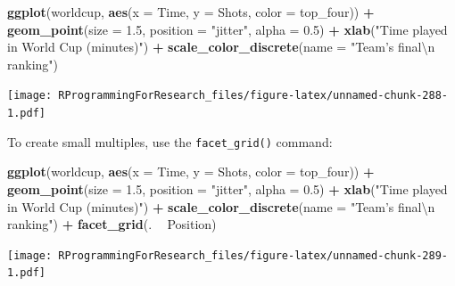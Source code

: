 \documentclass[]{book}
\makeatletter
\newenvironment{Shaded}{\begin{snugshade}}{\end{snugshade}}
\newcommand{\KeywordTok}[1]{\textcolor[rgb]{0.13,0.29,0.53}{\textbf{#1}}}
\newcommand{\DataTypeTok}[1]{\textcolor[rgb]{0.13,0.29,0.53}{#1}}
\newcommand{\FloatTok}[1]{\textcolor[rgb]{0.00,0.00,0.81}{#1}}
\newcommand{\CharTok}[1]{\textcolor[rgb]{0.31,0.60,0.02}{#1}}
\newcommand{\StringTok}[1]{\textcolor[rgb]{0.31,0.60,0.02}{#1}}
\newcommand{\OperatorTok}[1]{\textcolor[rgb]{0.81,0.36,0.00}{\textbf{#1}}}
\newcommand{\NormalTok}[1]{#1}
\newenvironment{kframe}{%
\medskip{}
\setlength{\fboxsep}{.8em}
 \def\at@end@of@kframe{}%
 \ifinner\ifhmode%
  \def\at@end@of@kframe{\end{minipage}}%
  \begin{minipage}{\columnwidth}%
 \fi\fi%
 \def\FrameCommand##1{\hskip\@totalleftmargin \hskip-\fboxsep
 \colorbox{shadecolor}{##1}\hskip-\fboxsep
     \hskip-\linewidth \hskip-\@totalleftmargin \hskip\columnwidth}%
 \MakeFramed {\advance\hsize-\width
   \@totalleftmargin\z@ \linewidth\hsize
   \@setminipage}}%
 {\par\unskip\endMakeFramed%
 \at@end@of@kframe}
\renewenvironment{Shaded}{\begin{kframe}}{\end{kframe}}
\theoremstyle{definition}
\theoremstyle{definition}
\theoremstyle{definition}
\theoremstyle{remark}
\makeatother
\begin{document}
\begin{Shaded}
\begin{Highlighting}[]
\KeywordTok{ggplot}\NormalTok{(worldcup, }\KeywordTok{aes}\NormalTok{(}\DataTypeTok{x =}\NormalTok{ Time, }\DataTypeTok{y =}\NormalTok{ Shots,}
                     \DataTypeTok{color =}\NormalTok{ top_four)) }\OperatorTok{+}
\StringTok{        }\KeywordTok{geom_point}\NormalTok{(}\DataTypeTok{size =} \FloatTok{1.5}\NormalTok{, }\DataTypeTok{position =} \StringTok{"jitter"}\NormalTok{,}
                   \DataTypeTok{alpha =} \FloatTok{0.5}\NormalTok{)  }\OperatorTok{+}\StringTok{ }
\StringTok{        }\KeywordTok{xlab}\NormalTok{(}\StringTok{"Time played in World Cup (minutes)"}\NormalTok{) }\OperatorTok{+}\StringTok{ }
\StringTok{        }\KeywordTok{scale_color_discrete}\NormalTok{(}\DataTypeTok{name =} \StringTok{"Team's final}\CharTok{\textbackslash{}n}\StringTok{ ranking"}\NormalTok{)}
\end{Highlighting}
\end{Shaded}

\texttt{[image: RProgrammingForResearch\_files/figure-latex/unnamed-chunk-288-1.pdf]}

To create small multiples, use the \texttt{facet\_grid()} command:

\begin{Shaded}
\begin{Highlighting}[]
\KeywordTok{ggplot}\NormalTok{(worldcup, }\KeywordTok{aes}\NormalTok{(}\DataTypeTok{x =}\NormalTok{ Time, }\DataTypeTok{y =}\NormalTok{ Shots,}
                     \DataTypeTok{color =}\NormalTok{ top_four)) }\OperatorTok{+}
\StringTok{        }\KeywordTok{geom_point}\NormalTok{(}\DataTypeTok{size =} \FloatTok{1.5}\NormalTok{, }\DataTypeTok{position =} \StringTok{"jitter"}\NormalTok{,}
                   \DataTypeTok{alpha =} \FloatTok{0.5}\NormalTok{)  }\OperatorTok{+}\StringTok{ }
\StringTok{        }\KeywordTok{xlab}\NormalTok{(}\StringTok{"Time played in World Cup (minutes)"}\NormalTok{) }\OperatorTok{+}\StringTok{ }
\StringTok{        }\KeywordTok{scale_color_discrete}\NormalTok{(}\DataTypeTok{name =} \StringTok{"Team's final}\CharTok{\textbackslash{}n}\StringTok{ ranking"}\NormalTok{) }\OperatorTok{+}\StringTok{ }
\StringTok{        }\KeywordTok{facet_grid}\NormalTok{(. }\OperatorTok{~}\StringTok{ }\NormalTok{Position)}
\end{Highlighting}
\end{Shaded}

\texttt{[image: RProgrammingForResearch\_files/figure-latex/unnamed-chunk-289-1.pdf]}
\end{document}
